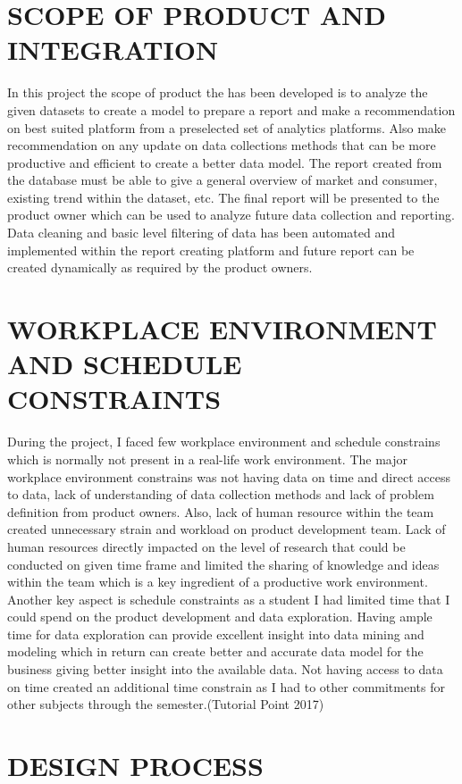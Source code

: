 \documentclass{article}
\begin{document}
\section{SCOPE OF PRODUCT AND INTEGRATION}\label{sec:Scope}
In this project the scope of product the has been developed is to analyze the given datasets to create a model to prepare a report and make a recommendation on best suited platform from a preselected set of analytics platforms. Also make recommendation on any update on data collections methods that can be more productive and efficient to create a better data model.  The report created from the database must be able to give a general overview of market and consumer, existing trend within the dataset, etc. The final report will be presented to the product owner which can be used to analyze future data collection and reporting. Data cleaning and basic level filtering of data has been automated and implemented within the report creating platform and future report can be created dynamically as required by the product owners. 

\section{WORKPLACE ENVIRONMENT AND SCHEDULE CONSTRAINTS}\label{sec:constrains}
During the project, I faced few workplace environment and schedule constrains which is normally not present in a real-life work environment. The major workplace environment constrains was not having data on time and direct access to data, lack of understanding of data collection methods and lack of problem definition from product owners. Also, lack of human resource within the team created unnecessary strain and workload on product development team. Lack of human resources directly impacted on the level of research that could be conducted on given time frame and limited the sharing of knowledge and ideas within the team which is a key ingredient of a productive work environment. Another key aspect is schedule constraints as a student I had limited time that I could spend on the product development and data exploration. Having ample time for data exploration can provide excellent insight into data mining and modeling which in return can create better and accurate data model for the business giving better insight into the available data. Not having access to data on time created an additional time constrain as I had to other commitments for other subjects through the semester.(Tutorial Point 2017)

\section{DESIGN PROCESS}\label{sec:Design}
\end{document}
